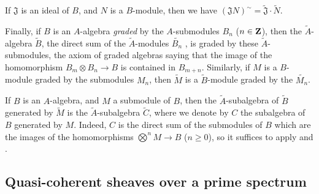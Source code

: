 \begin{env}[1.3.13]
If $\mathfrak{J}$ is an ideal of $B$, and $N$ is a $B$-module, then we have $(\mathfrak{J}N)^\sim=\widetilde{\mathfrak{J}}\cdot\widetilde{N}$.

Finally, if $B$ is an $A$-algebra \emph{graded} by the $A$-submodules $B_n$ ($n\in\mathbf{Z}$), then the $\widetilde{A}$-algebra $\widetilde{B}$, the direct sum of the $\widetilde{A}$-modules $\widetilde{B_n}$ , is graded by these $\widetilde{A}$-submodules, the axiom of graded algebras saying that the image of the homomorphism $B_m\otimes B_n\to B$ is contained in $B_{m+n}$.
Similarly, if $M$ is a $B$-module graded by the submodules $M_n$, then $\widetilde{M}$ is a $\widetilde{B}$-module graded by the $\widetilde{M_n}$.
\end{env}

\begin{env}[1.3.14]
\label{1.1.3.14}
If $B$ is an $A$-algebra, and $M$ a submodule of $B$, then the $\widetilde{A}$-subalgebra of $\widetilde{B}$ generated by $\widetilde{M}$  is the $\widetilde{A}$-subalgebra $\widetilde{C}$, where we denote by $C$ the subalgebra of $B$ generated by $M$.
Indeed, $C$ is the direct sum of the submodules of $B$ which are the images of the homomorphisms $\bigotimes^n M\to B$ ($n\geq 0$), so it suffices to apply  and .
\end{env}

\subsection{Quasi-coherent sheaves over a prime spectrum}
\label{subsection:1.1.4}


